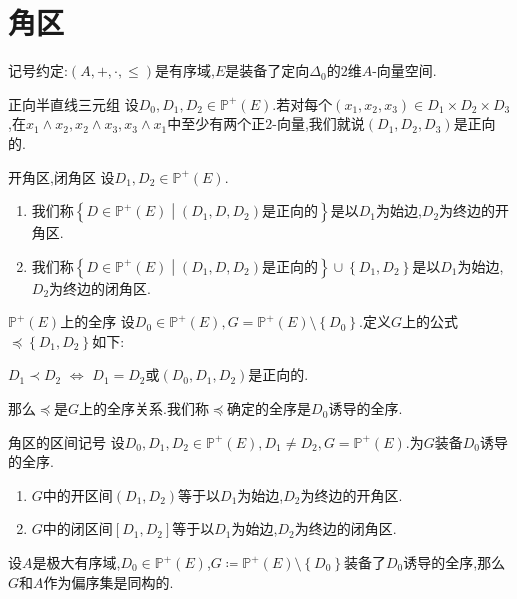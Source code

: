 \section{角区}

记号约定:$\left(A,+,\cdot,\leq\right)$是有序域,$E$是装备了定向$\Delta_{0}$的$2$维$A$-向量空间.

\begin{definition}{正向半直线三元组}{}
	设$D_{0},D_{1},D_{2}\in\mathbb{P}^{+}\left(E\right)$.若对每个$\left(x_{1},x_{2},x_{3}\right)\in D_{1}\times D_{2}\times D_{3}$,在$x_{1}\wedge x_{2},x_{2}\wedge x_{3},x_{3}\wedge x_{1}$中至少有两个正$2$-向量,我们就说$\left(D_{1},D_{2},D_{3}\right)$是正向的.
\end{definition}

\begin{definition}{开角区,闭角区}{}
	设$D_{1},D_{2}\in\mathbb{P}^{+}\left(E\right)$.
	\begin{enumerate}
		\item 我们称$\left\{D\in\mathbb{P}^{+}\left(E\right)\middle|\left(D_{1},D,D_{2}\right)\text{是正向的}\right\}$是以$D_{1}$为始边,$D_{2}$为终边的开角区.
		\item 我们称$\left\{D\in\mathbb{P}^{+}\left(E\right)\middle|\left(D_{1},D,D_{2}\right)\text{是正向的}\right\}\cup\left\{D_{1},D_{2}\right\}$是以$D_{1}$为始边,$D_{2}$为终边的闭角区.
	\end{enumerate}
\end{definition}

\begin{proposition}{$\mathbb{P}^{+}\left(E\right)$上的全序}{}
	设$D_{0}\in\mathbb{P}^{+}\left(E\right),G=\mathbb{P}^{+}\left(E\right)\setminus\left\{D_{0}\right\}$.定义$G$上的公式$\preccurlyeq\left\{D_{1},D_{2}\right\}$如下:
	\begin{center}
		$D_{1}\prec D_{2}$ $\iff$ $D_{1}=D_{2}$或$\left(D_{0},D_{1},D_{2}\right)$是正向的.
	\end{center}
	那么$\preccurlyeq$是$G$上的全序关系.我们称$\preccurlyeq$确定的全序是$D_{0}$诱导的全序.
\end{proposition}

\begin{corollary}{角区的区间记号}{}
	设$D_{0},D_{1},D_{2}\in\mathbb{P}^{+}\left(E\right),D_{1}\neq D_{2},G=\mathbb{P}^{+}\left(E\right)$.为$G$装备$D_{0}$诱导的全序.
	\begin{enumerate}
		\item $G$中的开区间$\left(D_{1},D_{2}\right)$等于以$D_{1}$为始边,$D_{2}$为终边的开角区.
		\item $G$中的闭区间$\left[D_{1},D_{2}\right]$等于以$D_{1}$为始边,$D_{2}$为终边的闭角区.
	\end{enumerate}
\end{corollary}

\begin{proposition}{}{}
	设$A$是极大有序域,$D_{0}\in\mathbb{P}^{+}\left(E\right)$,$G\coloneq\mathbb{P}^{+}\left(E\right)\setminus\left\{D_{0}\right\}$装备了$D_{0}$诱导的全序,那么$G$和$A$作为偏序集是同构的.
\end{proposition}